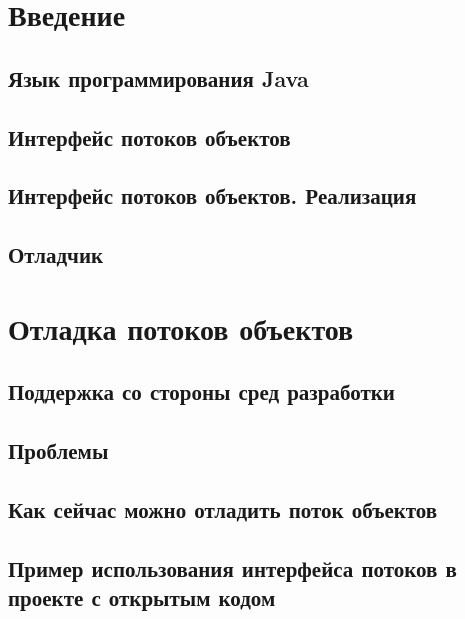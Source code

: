 
%
\section{Введение}
\subsection{Язык программирования Java}



\subsection{Интерфейс потоков объектов}

\subsection{Интерфейс потоков объектов. Реализация}




\subsection{Отладчик}





\section{Отладка потоков объектов}
\subsection{Поддержка со стороны сред разработки}

\subsection{Проблемы}

\subsection{Как сейчас можно отладить поток объектов}

\subsection{Пример использования интерфейса потоков в проекте с открытым кодом}


